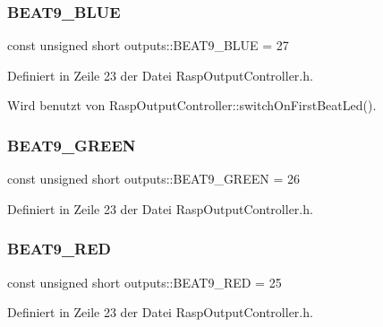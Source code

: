 \subsubsection{\texorpdfstring{B\+E\+A\+T9\+\_\+\+B\+L\+UE}{BEAT9\_BLUE}}
{\footnotesize\ttfamily const unsigned short outputs\+::\+B\+E\+A\+T9\+\_\+\+B\+L\+UE = 27}



Definiert in Zeile 23 der Datei Rasp\+Output\+Controller.\+h.



Wird benutzt von Rasp\+Output\+Controller\+::switch\+On\+First\+Beat\+Led().

\mbox{\label{namespaceoutputs_a0600b91e575643cfee3eb9e9e5b14839}} 
\subsubsection{\texorpdfstring{B\+E\+A\+T9\+\_\+\+G\+R\+E\+EN}{BEAT9\_GREEN}}
{\footnotesize\ttfamily const unsigned short outputs\+::\+B\+E\+A\+T9\+\_\+\+G\+R\+E\+EN = 26}



Definiert in Zeile 23 der Datei Rasp\+Output\+Controller.\+h.

\mbox{\label{namespaceoutputs_a57a4d2c831b8b263bc763032afddaa03}} 
\subsubsection{\texorpdfstring{B\+E\+A\+T9\+\_\+\+R\+ED}{BEAT9\_RED}}
{\footnotesize\ttfamily const unsigned short outputs\+::\+B\+E\+A\+T9\+\_\+\+R\+ED = 25}



Definiert in Zeile 23 der Datei Rasp\+Output\+Controller.\+h.

\mbox{\label{namespaceoutputs_a151156390f60151968f4092740d9d6b8}} 
